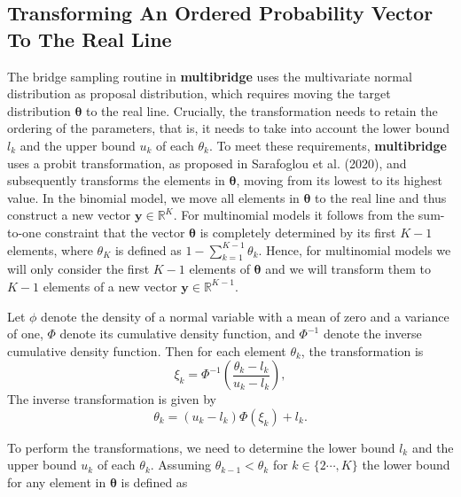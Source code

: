 \clearpage
\makeatletter
\efloat@restorefloats
\makeatother


\begin{appendix}
\hypertarget{transforming-an-ordered-probability-vector-to-the-real-line}{%
\section{Transforming An Ordered Probability Vector To The Real
Line}\label{transforming-an-ordered-probability-vector-to-the-real-line}}

The bridge sampling routine in \textbf{multibridge} uses the
multivariate normal distribution as proposal distribution, which
requires moving the target distribution \(\boldsymbol{\theta}\) to the
real line. Crucially, the transformation needs to retain the ordering of
the parameters, that is, it needs to take into account the lower bound
\(l_k\) and the upper bound \(u_k\) of each \(\theta_k\). To meet these
requirements, \textbf{multibridge} uses a probit transformation, as
proposed in Sarafoglou et al. (2020), and subsequently transforms the
elements in \(\boldsymbol{\theta}\), moving from its lowest to its
highest value. In the binomial model, we move all elements in
\(\boldsymbol{\theta}\) to the real line and thus construct a new vector
\(\boldsymbol{y} \in \mathbb{R}^{K}\). For multinomial models it follows
from the sum-to-one constraint that the vector \(\boldsymbol{\theta}\)
is completely determined by its first \(K - 1\) elements, where
\(\theta_K\) is defined as \(1 - \sum_{k = 1}^{K-1} \theta_k\). Hence,
for multinomial models we will only consider the first \(K - 1\)
elements of \(\boldsymbol{\theta}\) and we will transform them to
\(K - 1\) elements of a new vector
\(\boldsymbol{y} \in \mathbb{R}^{K - 1}\).

Let \(\phi\) denote the density of a normal variable with a mean of zero
and a variance of one, \(\Phi\) denote its cumulative density function,
and \(\Phi^{-1}\) denote the inverse cumulative density function. Then
for each element \(\theta_k\), the transformation is
\[\xi_k = \Phi^{-1}\left(\frac{\theta_k - l_k}{u_k - l_k}\right),\] The
inverse transformation is given by
\[\theta_k = (u_k - l_k) \Phi(\xi_k) + l_k.\]

To perform the transformations, we need to determine the lower bound
\(l_k\) and the upper bound \(u_k\) of each \(\theta_k\). Assuming
\(\theta_{k-1} < \theta_{k}\) for \(k \in \{2 \cdots, K\}\) the lower
bound for any element in \(\boldsymbol{\theta}\) is defined as


\end{appendix}
